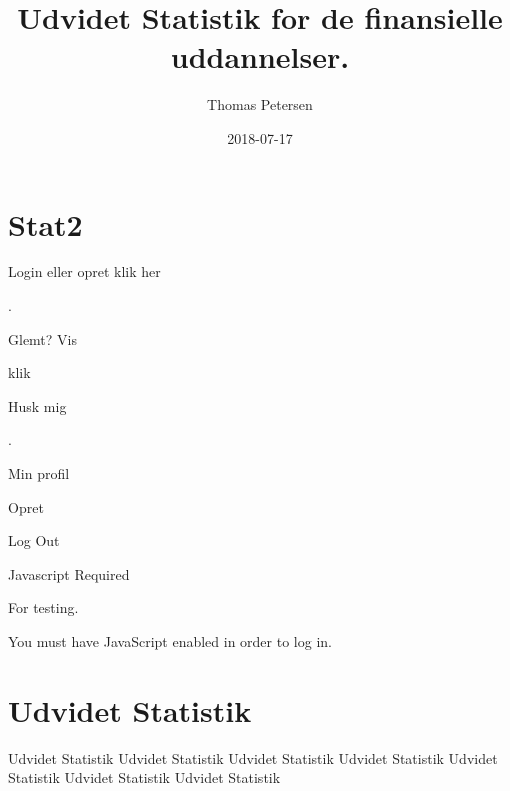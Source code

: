 \documentclass[]{book}
\title{Udvidet Statistik for de finansielle uddannelser.}
\author{Thomas Petersen}
\date{2018-07-17}
\theoremstyle{definition}
\theoremstyle{definition}
\theoremstyle{definition}
\theoremstyle{remark}
\begin{document}
\maketitle

{
\setcounter{tocdepth}{1}
\tableofcontents
}
\hypertarget{stat2}{%
\chapter*{Stat2}\label{stat2}}

\hypertarget{Settings}{}

\hypertarget{TopBar}{}
\hypertarget{Sentry_label}{}
\protect\hypertarget{Sentry_label_span}{}{Login eller opret klik her}

\hypertarget{magicGroup}{}
\hypertarget{messages}{}
.

\hypertarget{Sentry_emailDiv}{}
{ }

\hypertarget{Sentry_passwordDiv}{}
{ }

\hypertarget{Sentry_HIDpasswordDiv}{}
{ }

\hypertarget{unHideDiv}{}
\protect\hypertarget{forgotSpan}{}{Glemt?}
\protect\hypertarget{unHideSpan}{}{Vis}

\hypertarget{buttonDiv}{}
klik

\hypertarget{psistDiv}{}
 \protect\hypertarget{psistSpan}{}{Husk mig}

\hypertarget{goInside}{}
\protect\hypertarget{goInsideSpan}{}{.}

\hypertarget{myProfile}{}
Min profil

\hypertarget{Tilmeld}{}
Opret

\hypertarget{logOut}{}
{Log Out}

\hypertarget{xbox}{}

\hypertarget{Sentry_noJSLogin}{}
{Javascript Required}

\hypertarget{Sentry_loggingIn}{}

\hypertarget{Sentry_In}{}
For testing.

You must have JavaScript enabled in order to log in.

\hypertarget{udvidet-statistik}{%
\chapter{Udvidet Statistik}\label{udvidet-statistik}}

Udvidet Statistik Udvidet Statistik Udvidet Statistik Udvidet Statistik
Udvidet Statistik Udvidet Statistik Udvidet Statistik
\end{document}
